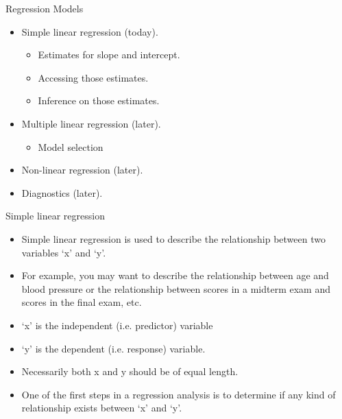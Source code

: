 \documentclass[pdf,default,slideColor,colorBG]{prosper}
\begin{document}
\begin{slide}{Regression Models}

\begin{itemize}
\item Simple linear regression (today).
    \begin{itemize}
    \item Estimates for slope and intercept.
    \item Accessing those estimates.
    \item Inference on those estimates.
    \end{itemize}
\item Multiple linear regression (later).
    \begin{itemize}
    \item Model selection
    \end{itemize}
\item Non-linear regression (later).
\item Diagnostics (later).
\end{itemize}
\end{slide}
\begin{slide}{Simple linear regression}
\begin{itemize}
\item Simple linear regression is used to describe the relationship
between two variables `x' and `y'. \item For example, you may want to describe the
relationship between age and blood pressure or the relationship
between scores in a midterm exam and scores in the final exam,
etc.
\item `x' is the independent (i.e. predictor) variable
\item `y' is the dependent (i.e. response) variable.
\item Necessarily both x and y should be of equal length.

\item One of the first steps in a regression analysis is to determine if any
kind of relationship exists between `x' and `y'.



\end{itemize}
\end{slide}
\end{document}
